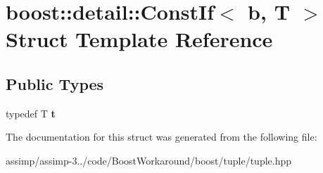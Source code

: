 \hypertarget{structboost_1_1detail_1_1_const_if}{\section{boost\+:\+:detail\+:\+:Const\+If$<$ b, T $>$ Struct Template Reference}
\label{structboost_1_1detail_1_1_const_if}
}
\subsection*{Public Types}
\begin{DoxyCompactItemize}
\item 
\hypertarget{structboost_1_1detail_1_1_const_if_ae532bdf6c42f32ccf643609923b60401}{typedef T {\bfseries t}}\label{structboost_1_1detail_1_1_const_if_ae532bdf6c42f32ccf643609923b60401}

\end{DoxyCompactItemize}


The documentation for this struct was generated from the following file\+:\begin{DoxyCompactItemize}
\item 
assimp/assimp-\/3../code/\+Boost\+Workaround/boost/tuple/tuple.\+hpp\end{DoxyCompactItemize}
